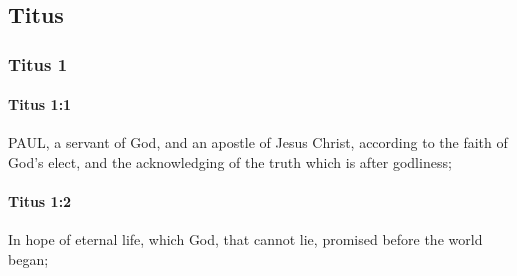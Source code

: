 \subsection{Titus}
	\label{TITUS}

	\subsubsection{Titus 1} %
		\label{TITUS-1}
		
		\paragraph{Titus 1:1} %
			\label{TITUS-1-1}

			PAUL, a servant of God, and an apostle of Jesus Christ, according to the faith of God's elect, and the acknowledging of the truth which is after godliness;

			\begin{framed}
			\scriptsize
				\begin{compactdesc}
					\item[SBLG] 
				\end{compactdesc}
			\end{framed}

		\paragraph{Titus 1:2} %
			\label{TITUS-1-2}

			In hope of eternal life, which God, that cannot lie, promised before the world began;


